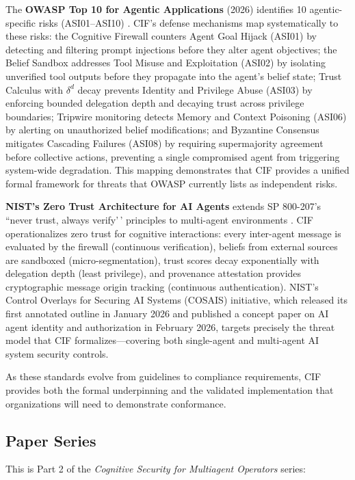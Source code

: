 \documentclass[
]{article}
\begin{document}
The \textbf{OWASP Top 10 for Agentic Applications} (2026) identifies 10
agentic-specific risks (ASI01--ASI10) \cite{owasp2025agentic}. CIF's
defense mechanisms map systematically to these risks: the Cognitive
Firewall counters Agent Goal Hijack (ASI01) by detecting and filtering
prompt injections before they alter agent objectives; the Belief Sandbox
addresses Tool Misuse and Exploitation (ASI02) by isolating unverified
tool outputs before they propagate into the agent's belief state; Trust
Calculus with \(\delta^d\) decay prevents Identity and Privilege Abuse
(ASI03) by enforcing bounded delegation depth and decaying trust across
privilege boundaries; Tripwire monitoring detects Memory and Context
Poisoning (ASI06) by alerting on unauthorized belief modifications; and
Byzantine Consensus mitigates Cascading Failures (ASI08) by requiring
supermajority agreement before collective actions, preventing a single
compromised agent from triggering system-wide degradation. This mapping
demonstrates that CIF provides a unified formal framework for threats
that OWASP currently lists as independent risks.

\textbf{NIST's Zero Trust Architecture for AI Agents} extends SP
800-207's ``never trust, always verify'\,' principles to multi-agent
environments \cite{nist2025cosais}. CIF operationalizes zero trust for
cognitive interactions: every inter-agent message is evaluated by the
firewall (continuous verification), beliefs from external sources are
sandboxed (micro-segmentation), trust scores decay exponentially with
delegation depth (least privilege), and provenance attestation provides
cryptographic message origin tracking (continuous authentication).
NIST's Control Overlays for Securing AI Systems (COSAIS) initiative,
which released its first annotated outline in January 2026 and published
a concept paper on AI agent identity and authorization in February 2026,
targets precisely the threat model that CIF formalizes---covering both
single-agent and multi-agent AI system security controls.

As these standards evolve from guidelines to compliance requirements,
CIF provides both the formal underpinning and the validated
implementation that organizations will need to demonstrate conformance.

\subsection{Paper Series}\label{paper-series}

This is Part 2 of the \emph{Cognitive Security for Multiagent Operators}
series:
\end{document}

